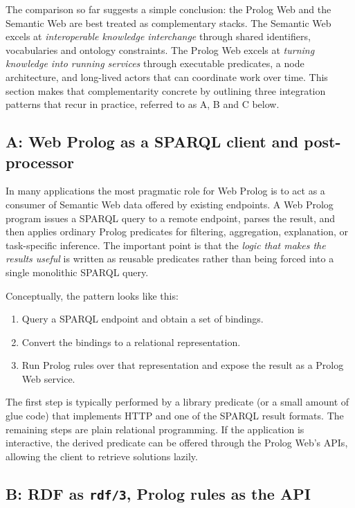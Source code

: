 The comparison so far suggests a simple conclusion: the Prolog Web and the Semantic Web are best treated as complementary stacks. The Semantic Web excels at \emph{interoperable knowledge interchange} through shared identifiers, vocabularies and ontology constraints. The Prolog Web excels at \emph{turning knowledge into running services} through executable predicates, a node architecture, and long-lived actors that can coordinate work over time. This section makes that complementarity concrete by outlining three integration patterns that recur in practice, referred to as A, B and C below.

\subsection{A: Web Prolog as a SPARQL client and post-processor}\label{sec:pattern-sparql-client}

In many applications the most pragmatic role for Web Prolog is to act as a consumer of Semantic Web data offered by existing endpoints. A Web Prolog program issues a SPARQL query to a remote endpoint, parses the result, and then applies ordinary Prolog predicates for filtering, aggregation, explanation, or task-specific inference. The important point is that the \emph{logic that makes the results useful} is written as reusable predicates rather than being forced into a single monolithic SPARQL query.

Conceptually, the pattern looks like this:
\begin{enumerate}
\item Query a SPARQL endpoint and obtain a set of bindings.
\item Convert the bindings to a relational representation.
\item Run Prolog rules over that representation and expose the result as a Prolog Web service.
\end{enumerate}

\noindent The first step is typically performed by a library predicate (or a small amount of glue code) that implements HTTP and one of the SPARQL result formats. The remaining steps are plain relational programming. If the application is interactive, the derived predicate can be offered through the Prolog Web's APIs, allowing the client to retrieve solutions lazily.

\subsection{B: RDF as \texttt{rdf/3}, Prolog rules as the API}\label{sec:pattern-rdf-local-rule-layer}

